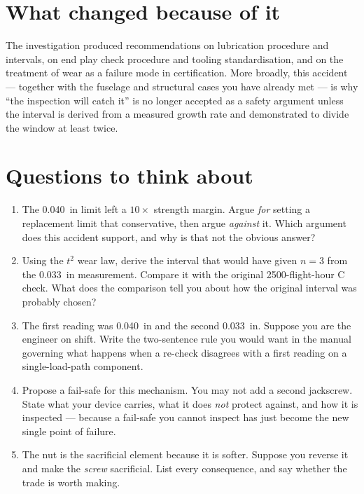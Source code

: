\documentclass[11pt,a4paper]{article}
\begin{document}
\section{What changed because of it}

The investigation produced recommendations on lubrication procedure and intervals, on end play check
procedure and tooling standardisation, and on the treatment of wear as a failure mode in
certification. More broadly, this accident --- together with the fuselage and structural cases you
have already met --- is why ``the inspection will catch it'' is no longer accepted as a safety
argument unless the interval is derived from a measured growth rate and demonstrated to divide the
window at least twice.

\section{Questions to think about}

\begin{enumerate}[leftmargin=*,itemsep=3pt]
\item The \SI{0.040}{in} limit left a $10\times$ strength margin. Argue \emph{for} setting a
  replacement limit that conservative, then argue \emph{against} it. Which argument does this
  accident support, and why is that not the obvious answer?
\item Using the $t^2$ wear law, derive the interval that would have given $n=3$ from the
  \SI{0.033}{in} measurement. Compare it with the original \num{2500}-flight-hour C check. What does
  the comparison tell you about how the original interval was probably chosen?
\item The first reading was \SI{0.040}{in} and the second \SI{0.033}{in}. Suppose you are the
  engineer on shift. Write the two-sentence rule you would want in the manual governing what happens
  when a re-check disagrees with a first reading on a single-load-path component.
\item Propose a fail-safe for this mechanism. You may not add a second jackscrew. State what your
  device carries, what it does \emph{not} protect against, and how it is inspected --- because a
  fail-safe you cannot inspect has just become the new single point of failure.
\item The nut is the sacrificial element because it is softer. Suppose you reverse it and make the
  \emph{screw} sacrificial. List every consequence, and say whether the trade is worth making.
\end{enumerate}
\end{document}
